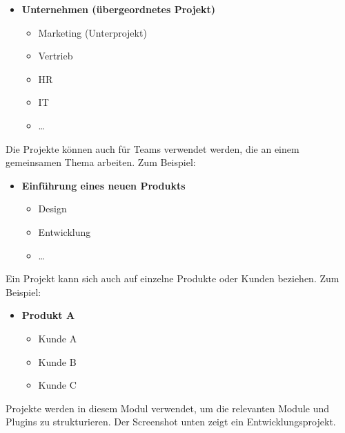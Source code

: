 \documentclass[
  letterpaper,
  DIV=11,
  numbers=noendperiod]{scrreprt}
\providecommand{\tightlist}{%
  \setlength{\itemsep}{0pt}\setlength{\parskip}{0pt}}\usepackage{longtable,booktabs,array}
\begin{document}
\begin{itemize}
\tightlist
\item
  \textbf{Unternehmen (übergeordnetes Projekt)}

  \begin{itemize}
  \tightlist
  \item
    Marketing (Unterprojekt)
  \item
    Vertrieb
  \item
    HR
  \item
    IT
  \item
    \ldots{}
  \end{itemize}
\end{itemize}

Die Projekte können auch für Teams verwendet werden, die an einem
gemeinsamen Thema arbeiten. Zum Beispiel:

\begin{itemize}
\tightlist
\item
  \textbf{Einführung eines neuen Produkts}

  \begin{itemize}
  \tightlist
  \item
    Design
  \item
    Entwicklung
  \item
    \ldots{}
  \end{itemize}
\end{itemize}

Ein Projekt kann sich auch auf einzelne Produkte oder Kunden beziehen.
Zum Beispiel:

\begin{itemize}
\tightlist
\item
  \textbf{Produkt A}

  \begin{itemize}
  \tightlist
  \item
    Kunde A
  \item
    Kunde B
  \item
    Kunde C
  \end{itemize}
\end{itemize}

Projekte werden in diesem Modul verwendet, um die relevanten Module und
Plugins zu strukturieren. Der Screenshot unten zeigt ein
Entwicklungsprojekt.
\end{document}
